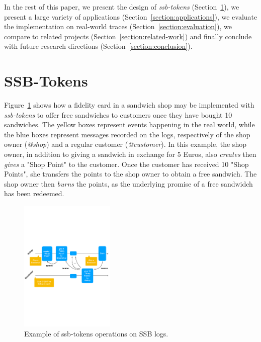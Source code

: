 \documentclass[sigplan,screen,10pt]{acmart}
\begin{document}
In the rest of this paper,  we present the design of \textit{ssb-tokens} (Section~\ref{section:design}), we present a large variety of applications (Section~\ref{section:applications}), we evaluate the implementation on real-world traces (Section~\ref{section:evaluation}), we compare to related projects (Section~\ref{section:related-work}) and finally conclude with future research directions (Section~\ref{section:conclusion}).




\section{SSB-Tokens}
\label{section:design}

Figure~\ref{figure:example} shows how a fidelity card in a sandwich shop may be implemented with \textit{ssb-tokens} to offer free sandwiches to customers once they have bought 10 sandwiches. The yellow boxes represent events happening in the real world, while the blue boxes represent messages recorded on the logs, respectively of the shop owner (\textit{@shop}) and a regular customer (\textit{@customer}). In this example, the shop owner, in addition to giving a sandwich in exchange for $5$ Euros, also \textit{creates} then \textit{gives} a "Shop Point" to the customer. Once the customer has received 10 "Shop Points", she transfers the points to the shop owner to obtain a free sandwich. The shop owner then \textit{burns} the points, as the underlying promise of a free sandwidch has been redeemed.

\begin{figure}[htb]
\includegraphics[width=0.40\textwidth]{./figures/example}
\caption{Example of ssb-tokens operations on SSB logs.}
\label{figure:example}
\end{figure}
\end{document}
